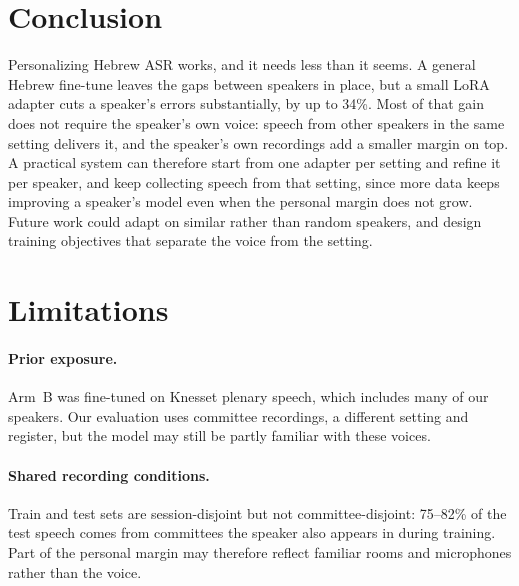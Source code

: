 \documentclass[11pt]{article}
\begin{document}

\section{Conclusion}

Personalizing Hebrew ASR works, and it needs less than it seems. A general
Hebrew fine-tune leaves the gaps between speakers in place, but a small LoRA
adapter cuts a speaker's errors substantially, by up to 34\%. Most of
that gain does not require the speaker's own voice: speech from other speakers
in the same setting delivers it, and the speaker's own recordings add a smaller
margin on top. A practical system can therefore start from one adapter per
setting and refine it per speaker, and keep collecting speech from
that setting, since more data keeps improving a speaker's model even when the
personal margin does not grow. Future work could adapt on similar rather than
random speakers, and design training objectives that separate the voice from the
setting.



\section*{Limitations}

\paragraph{Prior exposure.} Arm~B was fine-tuned on Knesset plenary speech, which includes many of our
speakers. Our evaluation uses committee recordings, a different setting and
register, but the model may still be partly familiar with these voices.

\paragraph{Shared recording conditions.} 
Train and test sets are session-disjoint but not
committee-disjoint: 75--82\% of the test speech comes from committees the speaker
also appears in during training. Part of the personal margin may therefore
reflect familiar rooms and microphones rather than the voice.
\end{document}
